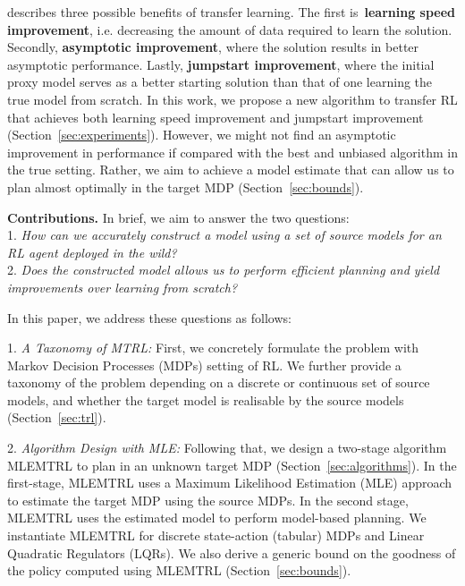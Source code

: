 \citet{langley2006transfer} describes three possible benefits of transfer learning. The first is~\textbf{learning speed improvement}, i.e. decreasing the amount of data required to learn the solution. Secondly, \textbf{asymptotic improvement}, where the solution results in better asymptotic performance. Lastly, \textbf{jumpstart improvement}, where the initial proxy model serves as a better starting solution than that of one learning the true model from scratch. In this work, we propose a new algorithm to transfer RL that achieves both learning speed improvement and jumpstart improvement (Section~\ref{sec:experiments}). However, we might not find an asymptotic improvement in performance if compared with the best and unbiased algorithm in the true setting. Rather, we aim to achieve a model estimate that can allow us to plan almost optimally in the target MDP (Section~\ref{sec:bounds}). %

\textbf{Contributions.} In brief, we aim to answer the two questions:\\
1. \emph{How can we accurately construct a model using a set of source models for an RL agent deployed in the wild?} \\
2. \emph{Does the constructed model allows us to perform efficient planning and yield improvements over learning from scratch?}

In this paper, we address these questions as follows:

1. \textit{A Taxonomy of MTRL:} First, we concretely formulate the problem with Markov Decision Processes (MDPs) setting of RL. We further provide a taxonomy of the problem depending on a discrete or continuous set of source models, and whether the target model is realisable by the source models (Section~\ref{sec:trl}).

2. \textit{Algorithm Design with MLE:} Following that, we design a two-stage algorithm MLEMTRL to plan in an unknown target MDP (Section~\ref{sec:algorithms}). In the first-stage, MLEMTRL uses a Maximum Likelihood Estimation (MLE) approach to estimate the target MDP using the source MDPs. In the second stage, MLEMTRL uses the estimated model to perform model-based planning. We instantiate MLEMTRL for discrete state-action (tabular) MDPs and Linear Quadratic Regulators (LQRs). We also derive a generic bound on the goodness of the policy computed using MLEMTRL (Section~\ref{sec:bounds}).

